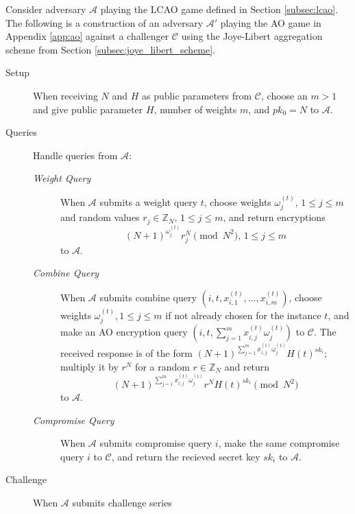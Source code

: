 \documentclass[twocolumn]{autart}
\begin{document}
\begin{pf}
    Consider adversary $\mathcal{A}$ playing the LCAO game defined in Section \ref{subsec:lcao}. The following is a construction of an adversary $\mathcal{A}'$ playing the AO game in Appendix \ref{app:ao} against a challenger $\mathcal{C}$ using the Joye-Libert aggregation scheme from Section \ref{subsec:joye_libert_scheme}.
    \begin{description}
        \item[Setup] When receiving $N$ and $H$ as public parameters from $\mathcal{C}$, choose an $m>1$ and give public parameter $H$, number of weights $m$, and $pk_0=N$ to $\mathcal{A}$.
        \item[Queries] Handle queries from $\mathcal{A}$:
        \begin{description}
            \item[\textit{Weight Query}] When $\mathcal{A}$ submits a weight query $t$, choose weights $\omega^{(t)}_j,\,1 \leq j \leq m$ and random values $r_j \in \mathbb{Z}_N,\,1 \leq j \leq m$, and return encryptions 
            \begin{equation*}
                (N+1)^{\omega^{(t)}_{j}}r_j^N\pmod{N^2},\,1\leq j\leq m
            \end{equation*}
            to $\mathcal{A}$.
            \item[\textit{Combine Query}] When $\mathcal{A}$ submits combine query $(i, t, x^{(t)}_{i,1},\dots,x^{(t)}_{i,m})$, choose weights $\omega^{(t)}_j,1 \leq j \leq m$ if not already chosen for the instance $t$, and make an AO encryption query $(i, t, \sum^m_{j=1}x^{(t)}_{i,j}\omega^{(t)}_j)$ to $\mathcal{C}$. The received response is of the form $(N+1)^{\sum^m_{j=1}x^{(t)}_{i,j}\omega^{(t)}_j}H(t)^{sk_i}$; multiply it by $r^N$ for a random $r \in \mathbb{Z}_N$ and return 
            \begin{equation*}
                (N+1)^{\sum^m_{j=1}x^{(t)}_{i,j}\omega^{(t)}_j}r^N H(t)^{sk_i} \pmod{N^2}
            \end{equation*}
            to $\mathcal{A}$.
            \item[\textit{Compromise Query}] When $\mathcal{A}$ submits compromise query $i$, make the same compromise query $i$ to $\mathcal{C}$, and return the recieved secret key $sk_i$ to $\mathcal{A}$.
        \end{description}
        \item[Challenge] When $\mathcal{A}$ submits challenge series
        \begin{equation*}

\end{equation*}
\end{description}
\end{pf}
\end{document}

